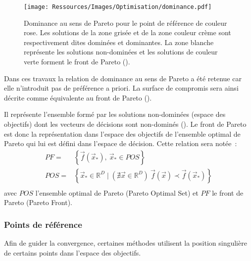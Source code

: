 \begin{figure}
    \centering
    \texttt{[image: Ressources/Images/Optimisation/dominance.pdf]}
    \caption[Dominance au sens de Pareto]
            {Dominance au sens de Pareto pour le point de référence de couleur rose.
             Les solutions de la zone grisée et de la zone couleur crème sont respectivement
             dites dominées et dominantes. La zone blanche représente les solutions
             non-dominées et les solutions de couleur verte forment le front de
             Pareto ().}
    \label{fig:dominance_pareto}
\end{figure}

Dans ces travaux la relation de dominance au sens de Pareto a été retenue car
elle n’introduit pas de préférence a priori. La surface de compromis sera ainsi
décrite comme équivalente au front de Pareto ().


\begin{Def}\label{def:front_de_pareto}
Il représente l’ensemble formé par les solutions non-dominées (espace des objectifs)
dont les vecteurs de décisions sont non-dominés ().
Le front de Pareto est donc la représentation dans l’espace des objectifs
de l’ensemble optimal de Pareto qui lui est défini dans l’espace de décision.
Cette relation sera notée~:
\begin{equation}
  \begin{aligned}
    PF   =& \left\{ \vec{f}(\vec{x}_{*}), \  \vec{x}_{*} \in POS \right\} \\
    POS  =& \left\{ \vec{x}_{*} \in \mathbb{R}^{D} \mid (\nexists \vec{x} \in
            \mathbb{R}^{D}) \  \vec{f}(\vec{x}) \prec \vec{f}(\vec{x}_{*}) \right\} \\
  \end{aligned}
\end{equation}
avec $POS$ l’ensemble optimal de Pareto (Pareto Optimal Set) et $PF$ le front de
Pareto (Pareto Front).
\end{Def}


\subsubsection{Points de référence} %
\label{ssub:points_de_reference}
Afin de guider la convergence, certaines méthodes utilisent la position singulière
de certains points dans l’espace des objectifs.
